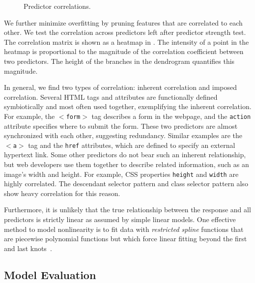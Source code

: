 \begin{figure}[t]
\hspace*{1pt}
\caption{Predictor correlations.}
\label{fig:pred_cor}
\end{figure}

We further minimize overfitting by pruning features that are correlated to each other.  We test the correlation across predictors left after predictor strength test.  The correlation matrix is shown as a heatmap in . The intensity of a point in the heatmap is proportional to the magnitude of the correlation coefficient between two predictors. The height of the branches in the dendrogram quantifies this magnitude.

In general, we find two types of correlation: inherent correlation and imposed correlation. Several HTML tags and attributes are functionally defined symbiotically and most often used together, exemplifying the inherent correlation. For example, the $<$\texttt{form}$>$ tag describes a form in the webpage, and the \texttt{action} attribute specifies where to submit the form. These two predictors are almost synchronized with each other, suggesting redundancy. Similar examples are the $<$\texttt{a}$>$ tag and the \texttt{href} attributes, which are defined to specify an external hypertext link. Some other predictors do not bear such an inherent relationship, but web developers use them together to describe related information, such as an image's width and height. For example, CSS properties \texttt{height} and \texttt{width} are highly correlated. The descendant selector pattern and class selector pattern also show heavy correlation for this reason.

Furthermore, it is unlikely that the true relationship between the response and all predictors is strictly linear as assumed by simple linear models.  One effective method to model nonlinearity is to fit data with \textit{restricted spline} functions that are piecewise polynomial functions but which force linear fitting beyond the first and last knots~\cite{ESL}.

\subsection{Model Evaluation}
\label{sec:runtime:load:model_eval}

